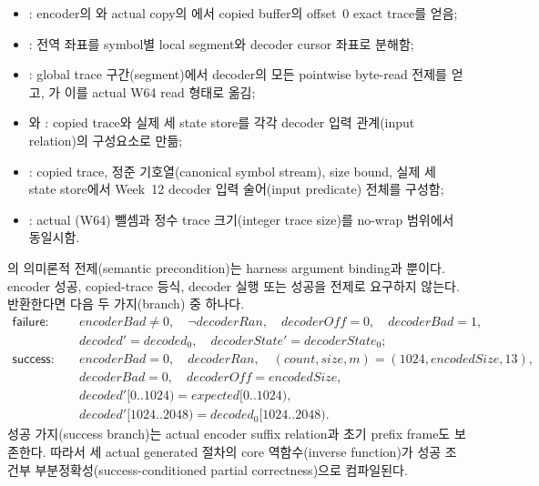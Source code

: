 \begin{itemize}
  \item {}: encoder의
        와 actual copy의 에서
        copied buffer의 offset~0 exact trace를 얻음;
  \item {}: 전역
         좌표를 symbol별 local segment와 decoder cursor
        좌표로 분해함;
  \item {}:
        global trace 구간(segment)에서 decoder의 모든 pointwise byte-read 전제를
        얻고, 가 이를 actual
        W64 read 형태로 옮김;
  \item {}와
        : copied trace와 실제 세 state
        store를 각각 decoder 입력 관계(input relation)의 구성요소로 만듦;
  \item {}: copied trace,
        정준 기호열(canonical symbol stream), size bound, 실제 세 state store에서
        Week~12 decoder 입력 술어(input predicate) 전체를 구성함;
  \item {}: actual (W64) 뺄셈과
        정수 trace 크기(integer trace size)를 no-wrap 범위에서 동일시함.
\end{itemize}

\begin{verified}
의 의미론적 전제(semantic
precondition)는 harness argument binding과
뿐이다. encoder 성공, copied-trace 등식,
decoder 실행 또는 성공을 전제로 요구하지 않는다. 반환한다면 다음 두 가지(branch)
중 하나다.
\[
\begin{aligned}
\mathsf{failure}:\quad
  &encoderBad\ne0,\quad \neg decoderRan,\quad decoderOff=0,\quad decoderBad=1,\\
  &decoded'=decoded_0,\quad decoderState'=decoderState_0;\\[0.3em]
\mathsf{success}:\quad
  &encoderBad=0,\quad decoderRan,\quad (count,size,m)=(1024,encodedSize,13),\\
  &decoderBad=0,\quad decoderOff=encodedSize,\\
  &decoded'[0..1024)=expected[0..1024),\\
  &decoded'[1024..2048)=decoded_0[1024..2048).
\end{aligned}
\]
성공 가지(success branch)는 actual encoder suffix relation과 초기 prefix frame도
보존한다. 따라서 세 actual generated 절차의 core 역함수(inverse function)가 성공
조건부 부분정확성(success-conditioned partial correctness)으로 컴파일된다.
\end{verified}

